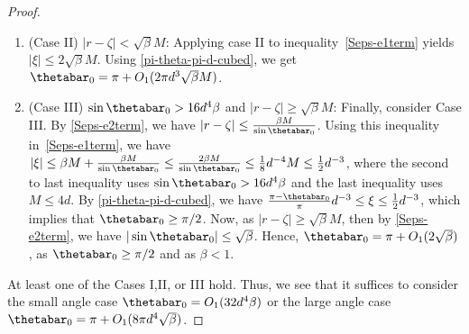 \begin{proof}
\begin{enumerate}
\item[] (Case II) $|r -\zeta| < \sqrt{\beta} M$: Applying case II to inequality~\eqref{Seps-e1term} yields $|\xi| \leq 2 \sqrt{\beta} M$.  Using \eqref{pi-theta-pi-d-cubed}, we get $\thetabar_0 = \pi + O_1(2 \pi d^3 \sqrt{\beta} M)$. 
  
\item[] (Case III) $\sin \thetabar_0 > 16 d^4 \beta$ and $|r - \zeta| \geq \sqrt{\beta} M$: 
   Finally, consider Case III.  By \eqref{Seps-e2term}, we have $|r - \zeta| \leq \frac{\beta M}{\sin\thetabar_0}$. 
Using this inequality in~\eqref{Seps-e1term}, we have $|\xi| \leq \beta M + \frac{\beta M}{\sin \thetabar_0} \leq \frac{2 \beta M}{\sin \thetabar_0} \leq \frac{1}{8} d^{-4} M \leq \frac{1}{2} d^{-3}$, where the second to last inequality uses $\sin \thetabar_0 > 16 d^4 \beta$ and the last inequality uses $M \leq 4 d$.  By \eqref{pi-theta-pi-d-cubed},  we have $\frac{\pi - \thetabar_0}{\pi} d^{-3} \leq \xi \leq \frac{1}{2} d^{-3}$, which implies that $\thetabar_0 \geq \pi/2$.  Now, as $|r - \zeta| \geq \sqrt{\beta}M$, then by \eqref{Seps-e2term}, we have $|\sin\thetabar_0| \leq \sqrt{\beta}$.  Hence,  $\thetabar_0 = \pi + O_1(2 \sqrt{\beta})$, as $\thetabar_0 \geq \pi/2$ and as $\beta < 1$.  
\end{enumerate}
At least one of the Cases I,II, or III hold. Thus, we see that it suffices to consider the small angle case $\thetabar_0 = O_1(32 d^4 \beta)$ or the large angle case $\thetabar_0 = \pi + O_1(8 \pi d^4 \sqrt{\beta})$. 



\end{proof}
